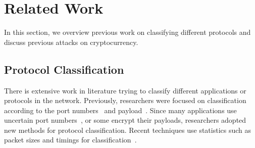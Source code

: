 
\section{Related Work}\label{related}
In this section, we overview previous work on 
classifying different protocols and discuss previous attacks on \bc cryptocurrency.

\subsection{Protocol Classification}
There is extensive work in literature trying to classify different applications or protocols in the network. Previously, researchers were focused on classification according to the port numbers~\cite{tcp_p2p,ports,port_mad,payload_p2p} and payload~\cite{payload_p2p,payload_content,payload_app,payload_moore}. Since many applications use uncertain port numbers~\cite{ports}, or some encrypt their payloads, researchers adopted new methods for protocol classification.
Recent techniques use statistics such as packet sizes and timings for classification~\cite{real_enc,web_p2p,blinc,prot_fing,semi,trafficClassSVM,svm2}. 
\begin{comment}
For example, in~\cite{blinc}, authors use a three-level classification mechanism -social, functional, and application level- to classify web, p2p, chat, media, gaming, data transfer, streaming, and network management traffic. Their result shows that their method can classify $80$ $-$ $90\%$ of traffic flows with more than $95\%$ accuracy. In~\cite{prot_fing}, authors use packet sizes, inter-arrival times, and their orderings to distinguish between HTTP, SMTP, SSH, etc. They use \textit{anomaly score} to check if a flow is statistically compatible with one of the traffic classes. Their approach results in more than $90\%$ hit-ratio for all the considered classes and false positive around $6\%$ in the worst scenario.

In~\cite{web_p2p}, authors use duration, number of bytes, and number
of packets to classify flows at the network core where only one side of the flow is available (server-to-client or client-to-server). They use the K-means algorithm for clustering traffics, including Web, P2P, FTP, and use byte and flow accuracy to evaluate their mechanism. 
They show that server-to-client datasets give the best performance: 95$\%$ and 79$\%$ flow and byte accuracy, respectively.\end{comment}

